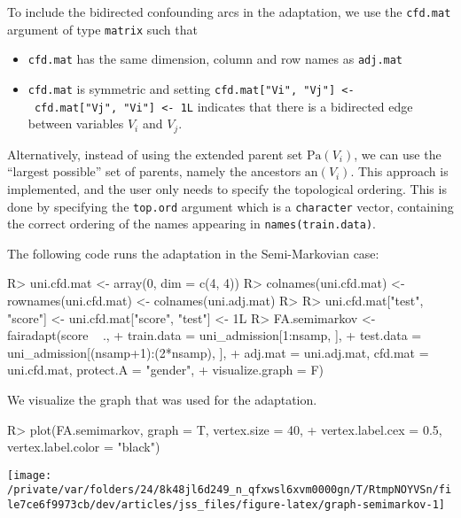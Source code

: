 \documentclass[
  notitle]{jss}
\providecommand{\tightlist}{%
  \setlength{\itemsep}{0pt}\setlength{\parskip}{0pt}}
\begin{document}
To include the bidirected confounding arcs in the adaptation, we use the
\texttt{cfd.mat} argument of type \texttt{matrix} such that

\begin{itemize}
\tightlist
\item
  \texttt{cfd.mat} has the same dimension, column and row names as
  \texttt{adj.mat}
\item
  \texttt{cfd.mat} is symmetric and setting
  \texttt{cfd.mat{[}"Vi",\ "Vj"{]}\ \textless{}-\ cfd.mat{[}"Vj",\ "Vi"{]}\ \textless{}-\ 1L}
  indicates that there is a bidirected edge between variables \(V_i\)
  and \(V_j\).
\end{itemize}

Alternatively, instead of using the extended parent set
\(\mathrm{Pa}(V_i)\), we can use the ``largest possible'' set of
parents, namely the ancestors \(\mathrm{an}(V_i)\). This approach is
implemented, and the user only needs to specify the topological
ordering. This is done by specifying the \texttt{top.ord} argument which
is a \texttt{character} vector, containing the correct ordering of the
names appearing in \texttt{names(train.data)}.

The following code runs the adaptation in the Semi-Markovian case:

\begin{CodeChunk}
\begin{CodeInput}
R> uni.cfd.mat <- array(0, dim = c(4, 4))
R> colnames(uni.cfd.mat) <- rownames(uni.cfd.mat) <- colnames(uni.adj.mat)
R> 
R> uni.cfd.mat["test", "score"] <- uni.cfd.mat["score", "test"] <- 1L
R> FA.semimarkov <- fairadapt(score ~ .,
+   train.data = uni_admission[1:nsamp, ],
+   test.data = uni_admission[(nsamp+1):(2*nsamp), ],
+   adj.mat = uni.adj.mat, cfd.mat = uni.cfd.mat, protect.A = "gender",
+   visualize.graph = F)
\end{CodeInput}
\end{CodeChunk}

We visualize the graph that was used for the adaptation.

\begin{CodeChunk}
\begin{CodeInput}
R> plot(FA.semimarkov, graph = T, vertex.size = 40,
+   vertex.label.cex = 0.5, vertex.label.color = "black")
\end{CodeInput}


\begin{center}\texttt{[image: /private/var/folders/24/8k48jl6d249\_n\_qfxwsl6xvm0000gn/T/RtmpNOYVSn/file7ce6f9973cb/dev/articles/jss\_files/figure-latex/graph-semimarkov-1]} \end{center}

\end{CodeChunk}
\end{document}
